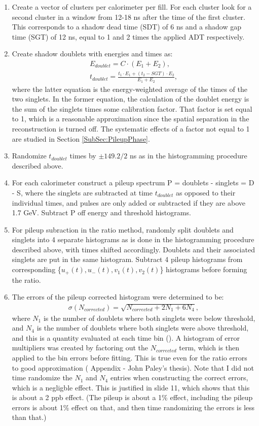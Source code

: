 	\begin{enumerate}
		\item{Create a vector of clusters per calorimeter per fill. For each cluster look for a second cluster in a window from 12-18 ns after the time of the first cluster. This corresponds to a shadow dead time (SDT) of 6 ns and a shadow gap time (SGT) of 12 ns, equal to 1 and 2 times the applied ADT respectively.}
		\item{Create shadow doublets with energies and times as:
			\begin{gather}
				E_{doublet} = C \cdot (E_{1} + E_{2}), \\
				t_{doublet} = \frac{t_{1} \cdot E_{1} + (t_{2}-SGT) \cdot E_{2}}{E_{1} + E_{2}},
			\end{gather}
		where the latter equation is the energy-weighted average of the times of the two singlets. In the former equation, the calculation of the doublet energy is the sum of the singlets times some calibration factor. That factor is set equal to 1, which is a reasonable approximation since the spatial separation in the reconstruction is turned off. The systematic effects of a factor not equal to 1 are studied in Section \ref{SubSec:PileupPhase}.}
		\item{Randomize $t_{doublet}$ times by $\pm 149.2/2$ ns as in the histogramming procedure described above.}
		\item{For each calorimeter construct a pileup spectrum P = doublets - singlets = D - S, where the singlets are subtracted at time $t_{doublet}$ as opposed to their individual times, and pulses are only added or subtracted if they are above 1.7 GeV. Subtract P off energy and threshold histograms.}
		\item{For pileup subraction in the ratio method, randomly split doublets and singlets into 4 separate histograms as is done in the histogramming procedure described above, with times shifted accordingly. Doublets and their associated singlets are put in the same histogram. Subtract 4 pileup histograms from corresponding \{$u_{+}(t), u_{-}(t), v_{1}(t), v_{2}(t)$\} histograms before forming the ratio.}
		\item{The errors of the pileup corrected histogram were determined to be: 
			\begin{gather}
				\sigma(N_{corrected}) = \sqrt{N_{corrected} + 2 N_{1} + 6 N_{4}},
			\end{gather}
		where $N_{1}$ is the number of doublets where both singlets were below threshold, and $N_{4}$ is the number of doublets where both singlets were above threshold, and this is a quantity evaluated at each time bin (). A histogram of error multipliers was created by factoring out the $N_{corrected}$ term, which is then applied to the bin errors before fitting. This is true even for the ratio errors to good approximation ( Appendix - John Paley's thesis). Note that I did not time randomize the $N_{1}$ and $N_{4}$ entries when constructing the correct errors, which is a negligble effect. This is justified in  slide 11, which shows that this is about a 2 ppb effect. (The pileup is about a 1\% effect, including the pileup errors is about 1\% effect on that, and then time randomizing the errors is less than that.)}

\end{enumerate}
